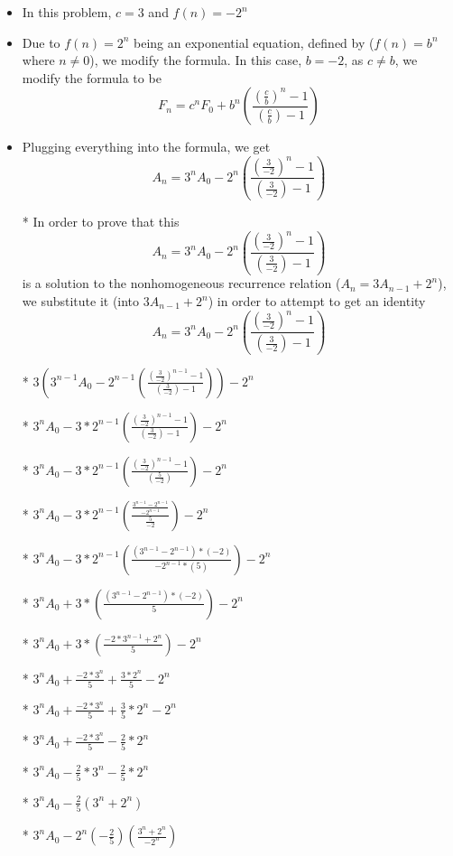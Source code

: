 \documentclass{article}
\begin{document}
\begin{enumerate}
\begin{enumerate}
\begin{itemize}
\begin{itemize}
      \item In this problem, $c=3$ and $f(n)=-2^{n}$
      \item Due to $f(n)=2^{n}$ being an exponential equation, defined by ($f(n)=b^{n}$ where $n\neq0$), we modify the formula. In this case, $b=-2$, as $c\neq b$, we modify the formula to be $$F_{n}=c^{n}F_{0} + b^{n}\left(\frac{(\frac{c}{b})^{n}-1}{(\frac{c}{b})-1}\right)$$
      \item Plugging everything into the formula, we get $$A_{n}=3^{n}A_{0} -2^{n}\left(\frac{(\frac{3}{-2})^{n}-1}{(\frac{3}{-2})-1}\right)$$
      \item [*] In order to prove that this $$A_{n}=3^{n}A_{0} -2^{n}\left(\frac{(\frac{3}{-2})^{n}-1}{(\frac{3}{-2})-1}\right)$$ is a solution to the nonhomogeneous recurrence relation ($A_{n}=3A_{n-1}+2^{n}$), we substitute it (into $3A_{n-1}+2^{n}$) in order to attempt to get an identity $$A_{n}=3^{n}A_{0} -2^{n}\left(\frac{(\frac{3}{-2})^{n}-1}{(\frac{3}{-2})-1}\right)$$
      \item [*] $3\left(3^{n-1}A_{0} -2^{n-1}\left(\frac{(\frac{3}{-2})^{n-1}-1}{(\frac{3}{-2})-1}\right)\right)-2^{n}$
      \item [*] $3^{n}A_{0} -3*2^{n-1}\left(\frac{(\frac{3}{-2})^{n-1}-1}{(\frac{3}{-2})-1}\right)-2^{n}$
      \item [*] $3^{n}A_{0} -3*2^{n-1}\left(\frac{(\frac{3}{-2})^{n-1}-1}{(\frac{5}{-2})}\right)-2^{n}$
      \item [*] $3^{n}A_{0} -3*2^{n-1}\left(\frac{\frac{3^{n-1}-2^{n-1}}{-2^{n-1} }}{\frac{5}{-2}}\right)-2^{n}$
      \item [*] $3^{n}A_{0} -3*2^{n-1}\left(\frac{(3^{n-1}-2^{n-1})*(-2)}{-2^{n-1}*(5) }\right)-2^{n}$
      \item [*] $3^{n}A_{0} +3*\left(\frac{(3^{n-1}-2^{n-1})*(-2)}{5}\right)-2^{n}$
      \item [*] $3^{n}A_{0} +3*\left(\frac{-2*3^{n-1}+2^{n}}{5}\right)-2^{n}$
      \item [*] $3^{n}A_{0} +\frac{-2*3^{n}}{5} +\frac{3*2^{n}}{5}-2^{n}$
      \item [*] $3^{n}A_{0} +\frac{-2*3^{n}}{5} +\frac{3}{5}*2^{n}-2^{n}$
      \item [*] $3^{n}A_{0} +\frac{-2*3^{n}}{5} -\frac{2}{5}*2^{n}$
      \item [*] $3^{n}A_{0} -\frac{2}{5}*3^{n} -\frac{2}{5}*2^{n}$
      \item [*] $3^{n}A_{0} -\frac{2}{5}\left(3^{n}+2^{n}\right)$
      \item [*] $3^{n}A_{0} -2^{n}(-\frac{2}{5})\left(\frac{3^{n}+2^{n}}{-2^{n}}\right)$

\end{itemize}
\end{itemize}
\end{enumerate}
\end{enumerate}
\end{document}
